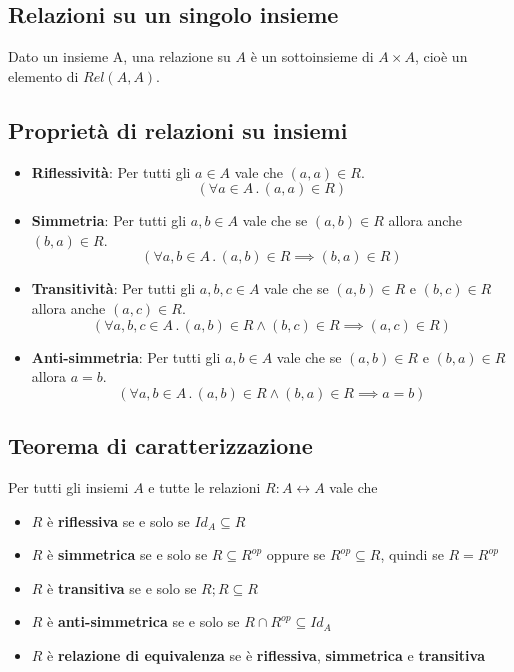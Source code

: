 \documentclass{article}
\begin{document}
\subsection{Relazioni su un singolo insieme}
Dato un insieme A, una relazione su \(A\) è un sottoinsieme di \(A \times A\), cioè un elemento di \(Rel(A,A)\).
\subsection*{Proprietà di relazioni su insiemi}
\begin{itemize}
    \item \textbf{Riflessività}: Per tutti gli \(a \in A\) vale che \((a,a) \in R\).
          \[(\forall a \in A \,.\, (a,a) \in R)\]
    \item \textbf{Simmetria}: Per tutti gli \(a,b \in A\) vale che se \((a,b) \in R\) allora anche \((b,a) \in R\).
          \[(\forall a,b \in A \,.\, (a,b) \in R \implies (b,a) \in R)\]
    \item \textbf{Transitività}: Per tutti gli \(a,b,c \in A\) vale che se \((a,b) \in R\) e \((b,c) \in R\) allora anche \((a,c) \in R\).
          \[(\forall a,b,c \in A \,.\, (a,b) \in R \land (b,c) \in R \implies (a,c) \in R)\]
    \item \textbf{Anti-simmetria}: Per tutti gli \(a,b \in A\) vale che se \((a,b) \in R\) e \((b,a) \in R\) allora \(a = b\).
          \[(\forall a,b \in A \,.\, (a,b) \in R \land (b,a) \in R \implies a = b)\]
\end{itemize}
\subsection*{Teorema di caratterizzazione}
Per tutti gli insiemi \(A\) e tutte le relazioni \(R: A \leftrightarrow A\) vale che
\begin{itemize}
    \item \(R\) è \textbf{riflessiva} se e solo se \(Id_A \subseteq R\)
    \item \(R\) è \textbf{simmetrica} se e solo se \(R \subseteq R^{op}\) oppure se \(R^{op} \subseteq R\), quindi se \(R = R^{op}\)
    \item \(R\) è \textbf{transitiva} se e solo se \(R;R \subseteq R\)
    \item \(R\) è \textbf{anti-simmetrica} se e solo se \(R \cap R^{op} \subseteq Id_A\)
    \item \(R\) è \textbf{relazione di equivalenza} se è \textbf{riflessiva}, \textbf{simmetrica} e \textbf{transitiva}
\end{itemize}
\end{document}
